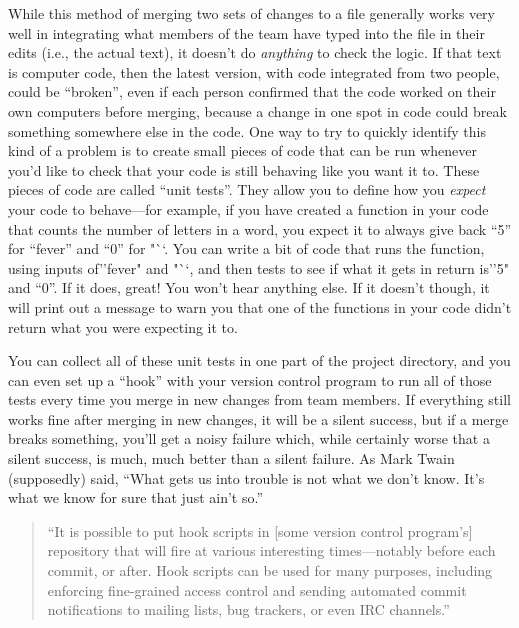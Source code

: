 \documentclass[]{tufte-book}
\begin{document}
While this method of merging two sets of changes to a file generally works very well in
integrating what members of the team have typed into the file in their edits (i.e., the
actual text), it doesn't do \emph{anything} to check the logic. If that text is computer
code, then the latest version, with code integrated from two people, could be ``broken'',
even if each person confirmed that the code worked on their own computers before merging,
because a change in one spot in code could break something somewhere else in the code.
One way to try to quickly identify this kind of a problem is to create small pieces of
code that can be run whenever you'd like to check that your code is still behaving like you
want it to. These pieces of code are called ``unit tests''. They allow you to define how
you \emph{expect} your code to behave---for example, if you have created a function in your code that
counts the number of letters in a word, you expect it to always give back ``5'' for ``fever''
and ``0'' for "``. You can write a bit of code that runs the function, using inputs of''fever" and "``, and then tests to see if what it gets in return is''5" and ``0''. If it does,
great! You won't hear anything else. If it doesn't though, it will print out a message
to warn you that one of the functions in your code didn't return what you were expecting
it to.

You can collect all of these unit tests in one part of the project directory, and you
can even set up a ``hook'' with your version control program to run all of those tests
every time you merge in new changes from team members.
If everything still works fine after
merging in new changes, it will be a silent success, but if a merge breaks something,
you'll get a noisy failure which, while certainly worse that a silent success, is much,
much better than a silent failure. As Mark Twain (supposedly) said, ``What gets us into
trouble is not what we don't know. It's what we know for sure that just ain't so.''

\begin{quote}
``It is possible to put hook scripts in {[}some version control program's{]} repository
that will fire at various interesting times---notably before each commit, or after.
Hook scripts can be used for many purposes, including enforcing fine-grained access
control and sending automated commit notifications to mailing lists, bug trackers,
or even IRC channels.'' \citep{raymondunderstanding}
\end{quote}
\end{document}

